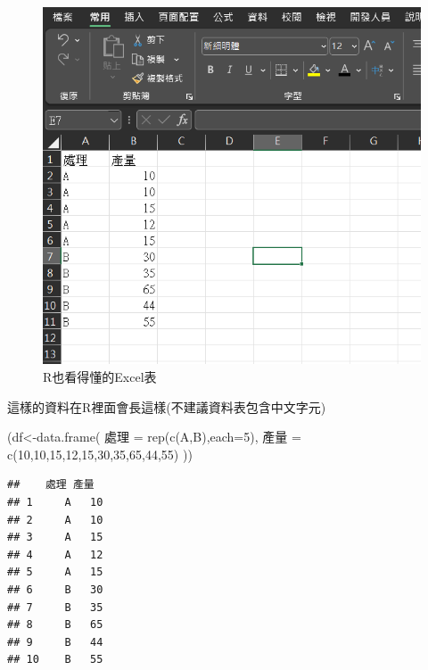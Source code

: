 \documentclass[
]{book}
\newenvironment{Shaded}{\begin{snugshade}}{\end{snugshade}}
\newcommand{\AttributeTok}[1]{\textcolor[rgb]{0.77,0.63,0.00}{#1}}
\newcommand{\DecValTok}[1]{\textcolor[rgb]{0.00,0.00,0.81}{#1}}
\newcommand{\FunctionTok}[1]{\textcolor[rgb]{0.00,0.00,0.00}{#1}}
\newcommand{\NormalTok}[1]{#1}
\newcommand{\OtherTok}[1]{\textcolor[rgb]{0.56,0.35,0.01}{#1}}
\newcommand{\StringTok}[1]{\textcolor[rgb]{0.31,0.60,0.02}{#1}}
\begin{document}
\begin{figure}
\centering
\includegraphics{image/excel.png}
\caption{R也看得懂的Excel表}
\end{figure}

這樣的資料在R裡面會長這樣(不建議資料表包含中文字元)

\begin{Shaded}
\begin{Highlighting}[]
\NormalTok{(df}\OtherTok{\textless{}{-}}\FunctionTok{data.frame}\NormalTok{(}
  \StringTok{\textquotesingle{}處理\textquotesingle{}} \OtherTok{=} \FunctionTok{rep}\NormalTok{(}\FunctionTok{c}\NormalTok{(}\StringTok{\textquotesingle{}A\textquotesingle{}}\NormalTok{,}\StringTok{\textquotesingle{}B\textquotesingle{}}\NormalTok{),}\AttributeTok{each=}\DecValTok{5}\NormalTok{),}
  \StringTok{\textquotesingle{}產量\textquotesingle{}} \OtherTok{=} \FunctionTok{c}\NormalTok{(}\DecValTok{10}\NormalTok{,}\DecValTok{10}\NormalTok{,}\DecValTok{15}\NormalTok{,}\DecValTok{12}\NormalTok{,}\DecValTok{15}\NormalTok{,}\DecValTok{30}\NormalTok{,}\DecValTok{35}\NormalTok{,}\DecValTok{65}\NormalTok{,}\DecValTok{44}\NormalTok{,}\DecValTok{55}\NormalTok{)}
\NormalTok{))}
\end{Highlighting}
\end{Shaded}

\begin{verbatim}
##    處理 產量
## 1     A   10
## 2     A   10
## 3     A   15
## 4     A   12
## 5     A   15
## 6     B   30
## 7     B   35
## 8     B   65
## 9     B   44
## 10    B   55
\end{verbatim}
\end{document}
